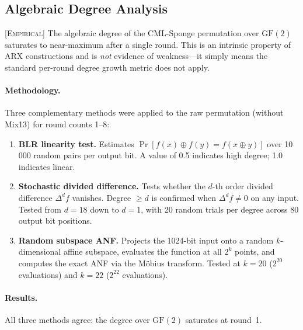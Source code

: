 \documentclass[runningheads]{llncs}
\newcommand{\empirical}[1]{\textsc{[Empirical]} #1}
\begin{document}
\subsection{Algebraic Degree Analysis}
\label{sec:algebraicdegree}

\empirical{The algebraic degree of the CML-Sponge permutation over $\mathrm{GF}(2)$
saturates to near-maximum after a single round.  This is an intrinsic property
of ARX constructions and is \emph{not} evidence of weakness---it simply means
the standard per-round degree growth metric does not apply.}

\paragraph{Methodology.}
Three complementary methods were applied to the raw permutation (without Mix13)
for round counts 1--8:
\begin{enumerate}[nosep]
\item \textbf{BLR linearity test.}
  Estimates $\Pr[f(x) \oplus f(y) = f(x \oplus y)]$ over 10\,000 random pairs
  per output bit.  A value of 0.5 indicates high degree; 1.0 indicates linear.
\item \textbf{Stochastic divided difference.}
  Tests whether the $d$-th order divided difference $\Delta^d f$ vanishes.
  Degree $\geq d$ is confirmed when $\Delta^d f \neq 0$ on any input.
  Tested from $d = 18$ down to $d = 1$, with 20 random trials per degree
  across 80 output bit positions.
\item \textbf{Random subspace ANF.}
  Projects the 1024-bit input onto a random $k$-dimensional affine subspace,
  evaluates the function at all $2^k$ points, and computes the exact ANF
  via the M\"obius transform.  Tested at $k = 20$ ($2^{20}$ evaluations)
  and $k = 22$ ($2^{22}$ evaluations).
\end{enumerate}

\paragraph{Results.}
All three methods agree: the degree over $\mathrm{GF}(2)$ saturates at round~1.
\end{document}
